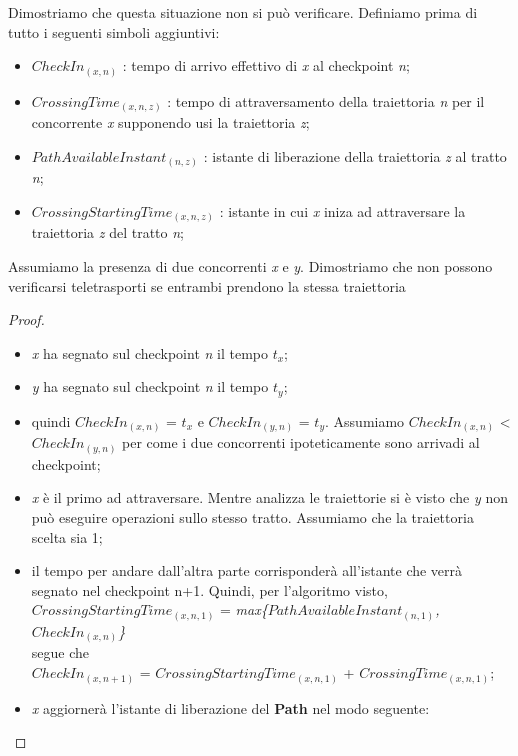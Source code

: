 \begin{itemize}
Dimostriamo che questa situazione non si può verificare. Definiamo prima di tutto i seguenti simboli aggiuntivi:
\begin{itemize}
\item $CheckIn_{(x,n)}$ : tempo di arrivo effettivo di \emph{x} al checkpoint \emph{n};
\item $CrossingTime_{(x,n,z)}$ : tempo di attraversamento della traiettoria \emph{n} per il concorrente \emph{x} supponendo usi la traiettoria
\emph{z}; 
\item $PathAvailableInstant_{(n,z)}$ : istante di liberazione della traiettoria \emph{z} al tratto \emph{n};
\item $CrossingStartingTime_{(x,n,z)}$ : istante in cui \emph{x} iniza ad attraversare la traiettoria \emph{z} del tratto \emph{n};
\end{itemize}
Assumiamo la presenza di due concorrenti \emph{x} e \emph{y}. Dimostriamo che non possono verificarsi teletrasporti se entrambi
prendono la stessa traiettoria
\begin{proof}
\begin{itemize}
\item \emph{x} ha segnato sul checkpoint \emph{n} il tempo \emph{$t_x$};
\item \emph{y} ha segnato sul checkpoint \emph{n} il tempo \emph{$t_y$};
\item quindi $CheckIn_{(x,n)}$ = $t_x$ e $CheckIn_{(y,n)}$ = $t_y$. Assumiamo $CheckIn_{(x,n)}$ < $CheckIn_{(y,n)}$ per come i due concorrenti
ipoteticamente sono arrivadi al checkpoint;
\item \emph{x} è il primo ad attraversare. Mentre analizza le traiettorie si è visto che \emph{y} non può eseguire operazioni
sullo stesso tratto. Assumiamo che la traiettoria scelta sia 1;
\item il tempo per andare dall'altra parte corrisponderà all'istante che verrà segnato nel checkpoint 
n+1. Quindi, per l'algoritmo visto, \\
$CrossingStartingTime_{(x,n,1)}$ = \emph{max\{$PathAvailableInstant_{(n,1)}$,$CheckIn_{(x,n)}$\}}\\
segue che\\
$CheckIn_{(x,n+1)}$ = $CrossingStartingTime_{(x,n,1)}$ + $CrossingTime_{(x,n,1)}$;
\item \emph{x} aggiornerà l'istante di liberazione del \textbf{Path} nel modo seguente:

\end{itemize}
\end{proof}
\end{itemize}
